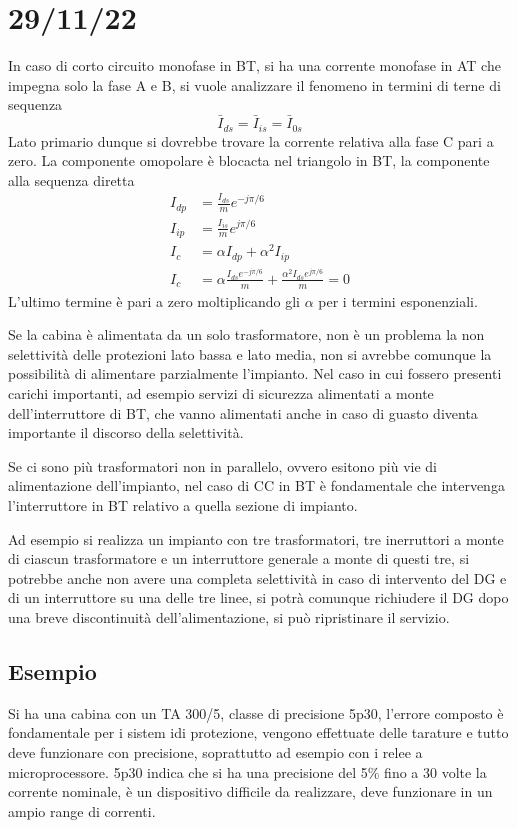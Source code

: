\section{29/11/22}
In caso di corto circuito monofase in BT, si ha una corrente monofase in AT che 
impegna solo la fase A e B, si vuole analizzare il fenomeno in termini di terne 
di sequenza
$$
\bar{I}_{ds}  = \bar{I}_{is} = \bar{I}_{0s}
$$
Lato primario dunque si dovrebbe trovare la corrente relativa alla fase C pari 
a zero.
La componente omopolare è blocacta nel triangolo in BT, la componente alla 
sequenza diretta 
$$
\begin{aligned}
	I_{dp} &= \frac{I_{ds}}{m}e^{-j\pi/6} \\
	I_{ip} &= \frac{I_{is}}{m}e^{j\pi/6} \\
	I_{c} &= \alpha I_{dp} + \alpha^2 I_{ip} \\
    I_c &= \alpha \frac{I_{ds}e^{-j\pi/6}}{m} + \frac{\alpha^2 I_{ds}e^{j\pi/6}}{m} = 0
\end{aligned}
$$
L'ultimo termine è pari a zero moltiplicando gli $\alpha$ per i termini 
esponenziali.

Se la cabina è alimentata da un solo trasformatore, non è un problema la non 
selettività delle protezioni lato bassa e lato media, non si avrebbe comunque 
la possibilità di alimentare parzialmente l'impianto.
Nel caso in cui fossero presenti carichi importanti, ad esempio servizi di 
sicurezza alimentati a monte dell'interruttore di BT, che vanno alimentati 
anche in caso di guasto diventa importante il discorso della selettività. 

Se ci sono più trasformatori non in parallelo, ovvero esitono più vie di 
alimentazione dell'impianto, nel caso di CC in BT è fondamentale che intervenga 
l'interruttore in BT relativo a quella sezione di impianto.

Ad esempio si realizza un impianto con tre trasformatori, tre inerruttori a monte di ciascun trasformatore e un interruttore generale a monte di questi tre, si potrebbe anche non avere una completa selettività in caso di intervento del DG e di un interruttore su una delle tre linee, si potrà comunque richiudere il DG dopo una breve discontinuità dell'alimentazione, si può ripristinare il servizio.

\subsection{Esempio}
Si ha una cabina con un TA 300/5, classe di precisione 5p30, l'errore composto è fondamentale per i sistem idi protezione, vengono effettuate delle tarature e tutto deve funzionare con precisione, soprattutto ad esempio con i relee a microprocessore. 5p30 indica che si ha una precisione del 5\% fino a 30 volte la corrente nominale, è un dispositivo difficile da realizzare, deve funzionare in un ampio range di correnti.

